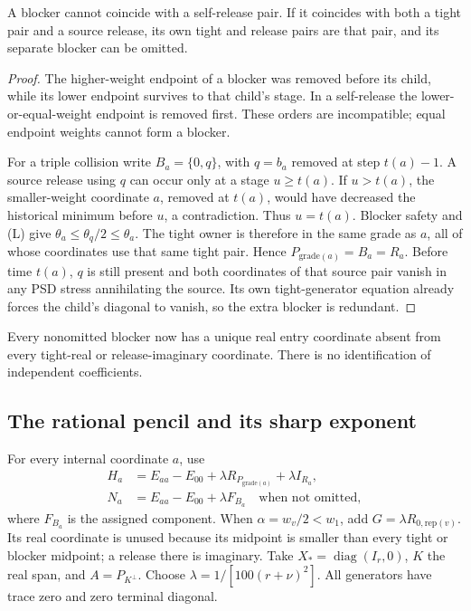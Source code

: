 \begin{lemma}\label{lem:triple}
A blocker cannot coincide with a self-release pair. If it coincides with both a tight pair and a source release, its own tight and release pairs are that pair, and its separate blocker can be omitted.
\end{lemma}
\begin{proof}
The higher-weight endpoint of a blocker was removed before its child, while its lower endpoint survives to that child's stage. In a self-release the lower-or-equal-weight endpoint is removed first. These orders are incompatible; equal endpoint weights cannot form a blocker.

For a triple collision write $B_a=\{0,q\}$, with $q=b_a$ removed at step $t(a)-1$. A source release using $q$ can occur only at a stage $u\ge t(a)$. If $u>t(a)$, the smaller-weight coordinate $a$, removed at $t(a)$, would have decreased the historical minimum before $u$, a contradiction. Thus $u=t(a)$. Blocker safety and (L) give $\theta_a\le\theta_q/2\le\theta_a$. The tight owner is therefore in the same grade as $a$, all of whose coordinates use that same tight pair. Hence $P_{\mathrm{grade}(a)}=B_a=R_a$. Before time $t(a)$, $q$ is still present and both coordinates of that source pair vanish in any PSD stress annihilating the source. Its own tight-generator equation already forces the child's diagonal to vanish, so the extra blocker is redundant.
\end{proof}
Every nonomitted blocker now has a unique real entry coordinate absent from every tight-real or release-imaginary coordinate. There is no identification of independent coefficients.

\subsection{The rational pencil and its sharp exponent}
For every internal coordinate $a$, use
\begin{align}
 H_a&=E_{aa}-E_{00}+\lambda R_{P_{\mathrm{grade}(a)}}+\lambda I_{R_a},\label{eq:fineH}\\
 N_a&=E_{aa}-E_{00}+\lambda F_{B_a}\quad\text{when not omitted},\label{eq:fineN}
\end{align}
where $F_{B_a}$ is the assigned component. When $\alpha=w_v/2<w_1$, add $G=\lambda R_{0,\mathrm{rep}(v)}$. Its real coordinate is unused because its midpoint is smaller than every tight or blocker midpoint; a release there is imaginary. Take $X_*=\operatorname{diag}(I_r,0)$, $K$ the real span, and $A=P_{K^\perp}$. Choose $\lambda=1/[100(r+\nu)^2]$. All generators have trace zero and zero terminal diagonal.

